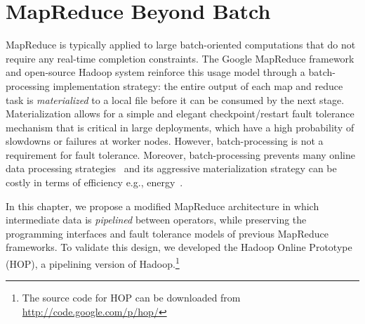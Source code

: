 \chapter[MapReduce Beyond Batch]{MapReduce Beyond Batch}
\label{ch:hop}

MapReduce is typically applied to large batch-oriented computations that do
not require any real-time completion constraints.  The Google MapReduce
framework~\cite{mapreduce-osdi} and open-source Hadoop system reinforce this
usage model through a batch-processing implementation strategy: the entire
output of each map and reduce task is \emph{materialized} to a local file
before it can be consumed by the next stage.  Materialization allows for a
simple and elegant checkpoint/restart fault tolerance mechanism that is critical
in large deployments, which have a high probability of slowdowns or failures at
worker nodes. However, batch-processing is not a requirement for fault tolerance. 
Moreover, batch-processing prevents many online data processing
strategies~\cite{onlineagg, borealis, stream, tcq-cidr} and its aggressive materialization
strategy can be costly in terms of efficiency e.g., energy~\cite{yanpei}.

In this chapter, we propose a modified MapReduce architecture in which
intermediate data is \emph{pipelined} between operators, while preserving the
programming interfaces and fault tolerance models of previous MapReduce
frameworks.  To validate this design, we developed the Hadoop Online Prototype
(HOP), a pipelining version of Hadoop.\footnote{The source code for HOP can be
downloaded from \url{http://code.google.com/p/hop/}}

